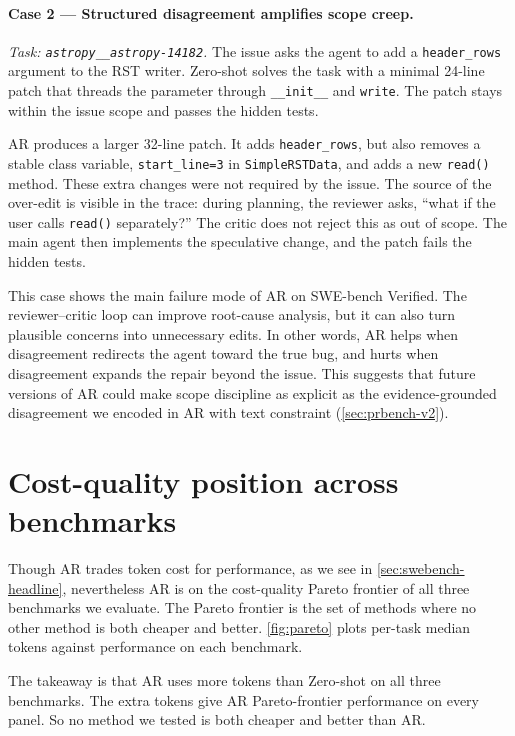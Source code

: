 \documentclass{article}
\begin{document}
\paragraph{Case 2 — Structured disagreement amplifies scope creep.}
\textit{Task: \texttt{astropy\_\_astropy-14182}.}
The issue asks the agent to add a \texttt{header\_rows} argument to the
RST writer. Zero-shot solves the task with a minimal 24-line patch that
threads the parameter through \texttt{\_\_init\_\_} and \texttt{write}.
The patch stays within the issue scope and passes the hidden tests.

AR produces a larger 32-line patch. It adds \texttt{header\_rows}, but
also removes a stable class variable,
\texttt{start\_line=3} in \texttt{SimpleRSTData}, and adds a new
\texttt{read()} method. These extra changes were not required by the
issue. The source of the over-edit is visible in the trace: during
planning, the reviewer asks, ``what if the user calls
\texttt{read()} separately?'' The critic does not reject this as out of
scope. The main agent then implements the speculative change, and the
patch fails the hidden tests.

This case shows the main failure mode of AR on SWE-bench Verified. The
reviewer--critic loop can improve root-cause analysis, but it can also
turn plausible concerns into unnecessary edits. In other words, AR helps
when disagreement redirects the agent toward the true bug, and hurts
when disagreement expands the repair beyond the issue. This suggests
that future versions of AR could make scope discipline as explicit as
the evidence-grounded disagreement we encoded in AR with text constraint (\autoref{sec:prbench-v2}).



\section{Cost-quality position across benchmarks}
\label{sec:cost}



Though AR trades token cost for performance, as we see in \autoref{sec:swebench-headline}, nevertheless AR is on the cost-quality Pareto frontier of all three benchmarks
we evaluate. The Pareto frontier is the set of methods where no other
method is both cheaper and better. \autoref{fig:pareto} plots per-task
median tokens against performance on each benchmark.



The takeaway is that AR uses more tokens than Zero-shot on all
three benchmarks. The extra tokens give AR Pareto-frontier
performance on every panel. So no method we tested is both
cheaper and better than AR.
\end{document}
